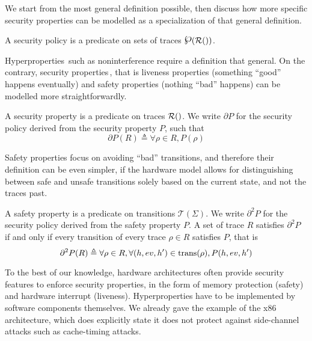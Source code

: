 We start from the most general definition possible, then discuss how more
specific security properties can be modelled as a specialization of that general
definition.

\begin{definition}
  \label{def:speccert:secpol}
  A security policy is a predicate on sets of traces
  $\powerset(\pathesLTS{Ez})$.
\end{definition}

Hyperproperties\,\cite{clarkson2010hyperproperties} such as noninterference
require a definition that general.
%
On the contrary, security properties\,\cite{schneider2000enforceable}, that is
liveness properties (something ``good'' happens eventually) and safety
properties (nothing ``bad'' happens) can be modelled more straightforwardly.

\begin{definition}
  A security property is a predicate on traces $\pathesLTS{Ez}$.
  We write $\partial P$ for the security policy derived from the security
  property $P$, such that
  \[
    \partial P(R) \triangleq \forall \rho \in R, P(\rho)
  \]
\end{definition}

Safety properties focus on avoiding ``bad'' transitions, and therefore their
definition can be even simpler, if the hardware model allows for distinguishing
between safe and unsafe transitions solely based on the current state, and not
the traces past.

\begin{definition}
  \label{def:speccert:safetyprop}
  A safety property is a predicate on transitions $\mathcal{T}(\Sigma)$.
  We write $\partial^2 P$ for the security policy derived from the safety
  property $P$.
  A set of trace $R$ satisfies $\partial^2 P$ if and only if every transition
  of every trace $\rho \in R$ satisfies $P$, that is
  \[
    \partial^2 P(R) \triangleq \forall \rho \in R, \forall (h, ev, h') \in
    \mathrm{trans}(\rho), P(h, ev, h')
  \]
\end{definition}

To the best of our knowledge, hardware architectures often provide security
features to enforce security properties, in the form of memory protection
(safety) and hardware interrupt (liveness).
%
Hyperproperties have to be implemented by software components themselves.
%
We already gave the example of the x86 architecture, which does explicitly state
it does not protect against side-channel attacks such as cache-timing attacks.


